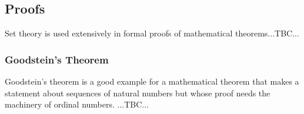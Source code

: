 \subsection{Proofs}
Set theory is used extensively in formal proofs of mathematical theorems...TBC...

\subsubsection{Goodstein's Theorem}
Goodstein's theorem is a good example for a mathematical theorem that makes a statement about sequences of natural numbers but whose proof needs the machinery of ordinal numbers. ...TBC...


\begin{comment}

ToDo:
-Infinite Sets 
 -Construction of natural, integer, rational and real numbers
 -Cardinal Numbers
 -Ordinal Numbers (as generalization of cardinal numbers)
 -Surreal Numbers
 -Cantor-Bernstein Theorem
 -Continuum Hypothesis
 -Notation: looks like in axiomatic set theory, it's more common to use lowercase letters like x,y for sets (rather than A,B, ...). That looks better in predicate logic formulas
 -maybe use \varphi for predicates



Set Containment:
-If for all x in A, x in B, then A \subseteq B

Lebesgue-Measure:
 https://www.youtube.com/watch?v=0VD3BWDLmU0

...set theory sometimes appears like a "write-only-language


Das Zermelo-Fraenkel-Axiomensystem der Mengenlehre (ZF)
https://www.youtube.com/watch?v=U10UYyXv5gM&list=PLb0zKSynM2PAuxxtMK1bxYPV_bUoPtpTB&index=1&t=0s

Bourbaki:
-Collective of authors writing a series of books in the early 1900s that aimed to build up all of math axiomatically. The first volume was about set theory

Was sind Kardinalzahlen? Was besagt die Kontinuumshypothese?
https://www.youtube.com/watch?v=qijXa3U4Nag&list=PLb0zKSynM2PCrgebQsfrzEsUIuA0I_wdG&index=1&t=0s



\end{comment}
